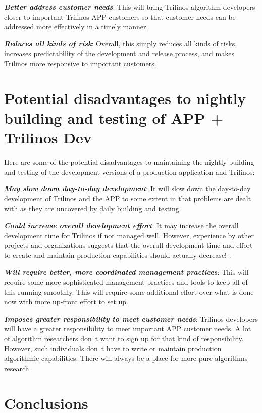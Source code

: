 \documentclass[pdf,ps2pdf,11pt]{SANDreport}
\begin{document}
{}\textit{\textbf{Better address customer needs}}: This will bring Trilinos
algorithm developers closer to important Trilinos APP customers so that
customer needs can be addressed more effectively in a timely manner.

{}\textit{\textbf{Reduces all kinds of risk}}: Overall, this simply reduces all
kinds of risks, increases predictability of the development and release
process, and makes Trilinos more responsive to important customers.


%
{}\section{Potential disadvantages to nightly building and testing of APP +
Trilinos Dev}
%

Here are some of the potential disadvantages to maintaining the nightly
building and testing of the development versions of a production application
and Trilinos:

{}\textit{\textbf{May slow down day-to-day development}}: It will slow down the
day-to-day development of Trilinos and the APP to some extent in that problems
are dealt with as they are uncovered by daily building and testing.

{}\textit{\textbf{Could increase overall development effort}}: It may increase the
overall development time for Trilinos if not managed well.  However,
experience by other projects and organizations suggests that the overall
development time and effort to create and maintain production capabilities
should actually decrease! {}\cite{book:code-complete-2}.

{}\textit{\textbf{Will require better, more coordinated management practices}}:
This will require some more sophisticated management practices and tools to
keep all of this running smoothly.  This will require some additional effort
over what is done now with more up-front effort to set up.

{}\textit{\textbf{Imposes greater responsibility to meet customer needs}}:
Trilinos developers will have a greater responsibility to meet important APP
customer needs.  A lot of algorithm researchers don~t want to sign up for that
kind of responsibility.  However, such individuals don~t have to write or
maintain production algorithmic capabilities.  There will always be a place
for more pure algorithms research.


%
\section{Conclusions}
%
\end{document}
